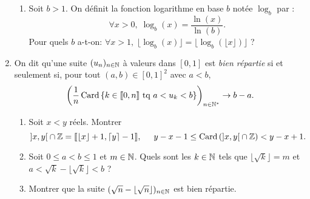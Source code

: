 \begin{enumerate}
\begin{enumerate}
    \item Soit $b > 1$. On définit la fonction logarithme en base $b$ notée $\log_b$ par :
\[
  \forall x > 0, \; \log_b(x) = \frac{\ln(x)}{\ln(b)}.
\]
Pour quels $b$ a-t-on:  $\forall x > 1, \; \lfloor \log_b(x) \rfloor = \lfloor \log_b(\lfloor x \rfloor) \rfloor$ ? 
  \end{enumerate}
  
  \item On dit qu'une suite $(u_n)_{n\in \mathbb{N}}$ à valeurs dans $[0,1]$ est \emph{bien répartie} si et seulement si, pour tout $(a,b) \in [0,1]^2$ avec $a < b$,
\[
  \left( \frac{1}{n} \operatorname{Card}\left\lbrace k \in \llbracket 0, n \rrbracket \text{ tq } a < u_k < b \right\rbrace \right)_{n \in \mathbb{N}^*} \rightarrow b - a.
\]

  \begin{enumerate}
    \item Soit $x < y$ réels. Montrer
\[
  \left] x, y \right[ \cap \mathbb{Z} = \llbracket \lfloor x \rfloor + 1, \lceil y \rceil - 1 \rrbracket, \hspace{0.5cm}
  y - x -1 \leq \operatorname{Card} \left( \left] x, y \right[ \cap \mathbb{Z} \right) < y - x + 1.
\]

    \item Soit $0 \leq a < b \leq 1$ et $m \in \mathbb{N}$.\newline
    Quels sont les $k\in \mathbb{N}$ tels que $\lfloor \sqrt{k} \rfloor = m$ et $a < \sqrt{k} - \lfloor \sqrt{k} \rfloor < b$ ?

    \item Montrer que la suite $(\sqrt{n} - \lfloor \sqrt{n} \rfloor)_{n \in \mathbb{N}}$ est bien répartie.
  \end{enumerate}


\end{enumerate}
